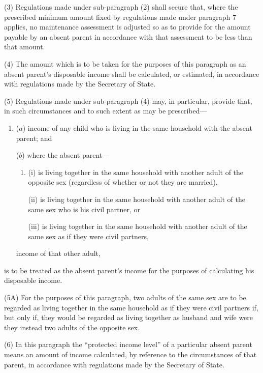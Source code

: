 \documentclass[a4paper]{article}
\begin{document}
{(3) Regulations made under sub-paragraph (2) shall secure that, where the prescribed minimum amount fixed by regulations made under paragraph 7 applies, no maintenance assessment is adjusted so as to provide for the amount payable by an absent parent in accordance with that assessment to be less than that amount.

(4) The amount which is to be taken for the purposes of this paragraph as an absent parent’s disposable income shall be calculated, or estimated, in accordance with regulations made by the Secretary of State.

(5) Regulations made under sub-paragraph (4) may, in particular, provide that, in such circumstances and to such extent as may be prescribed---
\begin{enumerate}\item[]
($a$) income of any child who is living in the same household with the absent parent; and

($b$) where the absent parent---
\begin{enumerate}\item[]
(i)
is living together in the same household with another adult of the
opposite sex (regardless of whether or not they are married),

(ii)
is living together in the same household with another adult of the same
sex who is his civil partner, or

(iii) is living together in the same household with another adult of the same
sex as if they were civil partners,
\end{enumerate}
income of that other adult,
\end{enumerate}
is to be treated as the absent parent’s income for the purposes of calculating his disposable income.

(5A) For the purposes of this paragraph, two adults of the same sex are to be regarded as living together in the same household as if they were civil partners if, but only if, they would be regarded as living together as husband and wife were they instead two adults of the opposite sex.

(6) In this paragraph the “protected income level” of a particular absent parent means an amount of income calculated, by reference to the circumstances of that parent, in accordance with regulations made by the Secretary of State.


}
\end{document}
